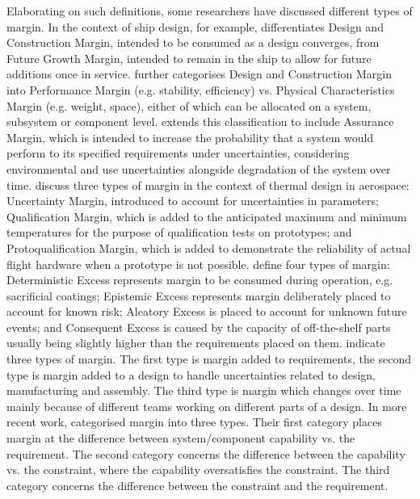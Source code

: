 Elaborating on such definitions, some researchers have discussed different types of margin. In the context of ship design, for example, \cite{Gale1975} differentiates Design and Construction Margin, intended to be consumed as a design converges, from Future Growth Margin, intended to remain in the ship to allow for future additions once in service. \cite{Gale1975} further categorises Design and Construction Margin into Performance Margin (e.g. stability, efficiency) vs. Physical Characteristics Margin (e.g. weight, space), either of which can be allocated on a system, subsystem or component level. \cite{Hockberger1982} extends this classification to include Assurance Margin, which is intended to increase the probability that a system would perform to its specified requirements under uncertainties, considering environmental and use uncertainties alongside degradation of the system over time. \citet{Thunnissen2004b} discuss three types of margin in the context of thermal design in aerospace: Uncertainty Margin, introduced to account for uncertainties in parameters; Qualification Margin, which is added to the anticipated maximum and minimum temperatures for the purpose of qualification tests on prototypes; and Protoqualification Margin, which is added to demonstrate the reliability of actual flight hardware when a prototype is not possible.  \cite{Cansler2016} define four types of margin: Deterministic Excess represents margin to be consumed during operation, e.g. sacrificial coatings; Epistemic Excess represents margin deliberately placed to account for known risk; Aleatory Excess is placed to account for unknown future events; and Consequent Excess is caused by the capacity of off-the-shelf parts usually being slightly higher than the requirements placed on them.  \cite{Eckert2017} indicate three types of margin. The first type is margin added to requirements, the second type is margin added to a design to handle uncertainties related to design, manufacturing and assembly. The third type is margin which changes over time mainly because of different teams working on different parts of a design. In more recent work, \cite{Eckert2019} categorised margin into three types. Their first category places margin at the difference between system/component capability vs. the requirement. The second category concerns the difference between the capability vs. the constraint, where the capability oversatisfies the constraint. The third category concerns the difference between the constraint and the requirement.   
  
